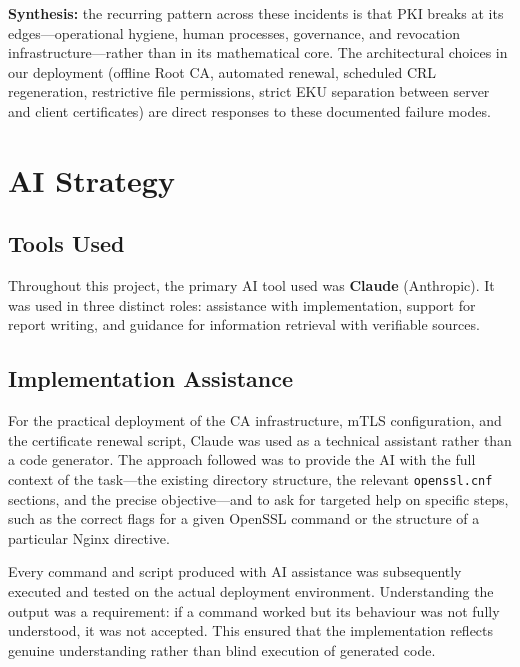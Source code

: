 \documentclass[10pt,twocolumn]{article}
\begin{document}
\begin{alertbox}
\footnotesize\textbf{Synthesis:} the recurring pattern across these
incidents is that PKI breaks at its edges---operational hygiene, human
processes, governance, and revocation infrastructure---rather than in its
mathematical core. The architectural choices in our deployment (offline
Root CA, automated renewal, scheduled CRL regeneration, restrictive file
permissions, strict EKU separation between server and client certificates)
are direct responses to these documented failure modes.
\end{alertbox}


\section{AI Strategy}

\subsection{Tools Used}

Throughout this project, the primary AI tool used was \textbf{Claude}
(Anthropic). It was used in three distinct roles: assistance with
implementation, support for report writing, and guidance for information
retrieval with verifiable sources.

\subsection{Implementation Assistance}

For the practical deployment of the CA infrastructure, mTLS configuration,
and the certificate renewal script, Claude was used as a technical assistant
rather than a code generator. The approach followed was to provide the AI
with the full context of the task---the existing directory structure, the
relevant \texttt{openssl.cnf} sections, and the precise objective---and to
ask for targeted help on specific steps, such as the correct flags for a
given OpenSSL command or the structure of a particular Nginx directive.

Every command and script produced with AI assistance was subsequently
executed and tested on the actual deployment environment. Understanding the
output was a requirement: if a command worked but its behaviour was not
fully understood, it was not accepted. This ensured that the implementation
reflects genuine understanding rather than blind execution of generated code.
\end{document}
